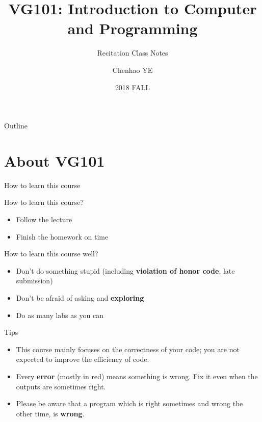 \documentclass{beamer}
\title[VG101 Recitation Class Notes]{VG101: Introduction to Computer and Programming}
\author{Chenhao YE}
\date{2018 FALL}
\institute[UM-SJTU Joint Institute]{VG101 TA Group, UM-SJTU Joint Institute}
\subtitle{Recitation Class Notes}
\begin{document}
\begin{frame}
  \titlepage
\end{frame}

\begin{frame}{Outline}
  \tableofcontents
\end{frame}


\section{About VG101}
\begin{frame}
\end{frame}

\begin{frame}{How to learn this course}
\begin{block}{How to learn this course?}
\begin{itemize}
    \item Follow the lecture
    \item Finish the homework on time
\end{itemize}
\end{block}

\begin{block}{How to learn this course well?}
\begin{itemize}
    \item Don't do something stupid (including \textbf{violation of honor code}, late submission)
    \item Don't be afraid of asking and \textbf{exploring}
    \item Do as many labs as you can
\end{itemize}
\end{block}
\end{frame}

\begin{frame}
\begin{block}{Tips}
\begin{itemize}
\item This course mainly focuses on the correctness of your code; you are not expected to improve the efficiency of code.
\item Every \textbf{error} (mostly in red) means something is wrong. Fix it even when the outputs are sometimes right.
\item Please be aware that a program which is right sometimes and wrong the other time, is \textbf{wrong}.
\end{itemize}
\end{block}
\end{frame}
\end{document}
